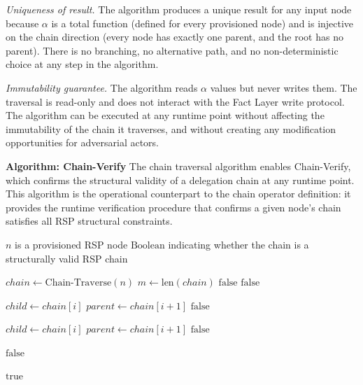 \textit{Uniqueness of result.} The algorithm produces a unique result for any input node because $\alpha$ is a total function (defined for every provisioned node) and is injective on the chain direction (every node has exactly one parent, and the root has no parent). There is no branching, no alternative path, and no non-deterministic choice at any step in the algorithm.

\textit{Immutability guarantee.} The algorithm reads $\alpha$ values but never writes them. The traversal is read-only and does not interact with the Fact Layer write protocol. The algorithm can be executed at any runtime point without affecting the immutability of the chain it traverses, and without creating any modification opportunities for adversarial actors.

\bigskip
\noindent\textbf{Algorithm: Chain-Verify}
The chain traversal algorithm enables Chain-Verify, which confirms the structural validity of a delegation chain at any runtime point. This algorithm is the operational counterpart to the chain operator definition: it provides the runtime verification procedure that confirms a given node's chain satisfies all RSP structural constraints.

\begin{algorithm}
\caption{Chain-Verify($n$) --- Verify the authorization chain from node $n$ to human anchor}
\label{alg:chain-verify}
\begin{algorithmic}[1]
\REQUIRE $n$ is a provisioned RSP node
\ENSURE $\text{Boolean}$ indicating whether the chain is a structurally valid RSP chain

\STATE $chain \leftarrow \text{Chain-Traverse}(n)$
\STATE $m \leftarrow \text{len}(chain)$
\STATE {}
    \RETURN $\text{false}$ 
\ENDIF
{}
    \RETURN $\text{false}$ 
\ENDIF

\STATE {}
    \STATE $child \leftarrow chain[i]$
    \STATE $parent \leftarrow chain[i+1]$
        \RETURN $\text{false}$ 
    \ENDIF
\ENDFOR

\STATE {}
    \STATE $child \leftarrow chain[i]$
    \STATE $parent \leftarrow chain[i+1]$
        \RETURN $\text{false}$ 
    \ENDIF
\ENDFOR

\STATE {}
        \RETURN $\text{false}$ 
    \ENDIF
\ENDFOR

\RETURN $\text{true}$
\end{algorithmic}
\end{algorithm}

